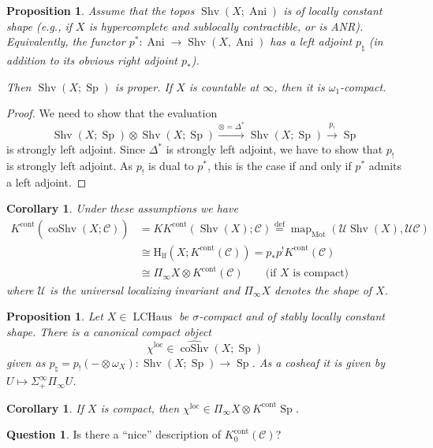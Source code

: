 \documentclass[draft]{amsart}
\renewcommand{\H}{\mathrm{H}}
\newcommand{\wh}[1]{\widehat{#1}}
\newcommand{\cat}[1]{\mathcal{#1}}
\newcommand{\blank}{-} %
\DeclareMathOperator{\Anima}{Ani}
\DeclareMathOperator{\LCHaus}{LCHaus}
\DeclareMathOperator{\coShv}{coShv}
\DeclareMathOperator{\Mot}{Mot}
\DeclareMathOperator{\map}{map}
\DeclareMathOperator{\Shv}{Shv}
\DeclareMathOperator{\Sp}{Sp}
\newtheorem{prop}[thm]{Proposition}
\newtheorem{cor}[thm]{Corollary}
\theoremstyle{definition}
\newtheorem{question}[thm]{Question}
\begin{document}
\begin{prop}
Assume that the topos $\Shv(X;\Anima)$ is of locally constant shape (e.g., if $X$ is hypercomplete and sublocally contractible, or is ANR). Equivalently, the functor $p^*\colon \Anima \to \Shv(X,\Anima)$ has a left adjoint $p_{\natural}$ (in addition to its obvious right adjoint $p_*$).

Then $\Shv(X; \Sp)$ is proper. If $X$ is countable at $\infty$, then it is $\omega_1$-compact.
\end{prop}
\begin{proof}
We need to show that the evaluation
\[
\Shv(X;\Sp) \otimes \Shv(X;\Sp) \xrightarrow{\otimes=\Delta^*} \Shv(X;\Sp) \xrightarrow{p_!} \Sp
\]
is strongly left adjoint. Since $\Delta^*$ is strongly left adjoint, we have to show that $p_!$ is strongly left adjoint. As $p_!$ is dual to $p^*$, this is the case if and only if $p^*$ admits a left adjoint.
\end{proof}

\begin{cor}
Under these assumptions we have
\begin{align*}
K^{\mathrm{cont}}(\wh{\coShv}(X;\cat C)) &= {KK}^{\mathrm{cont}}(\Shv(X); \cat C) \stackrel{\text{def}}{=} \map_{\Mot}(\cat U\Shv(X), \cat U\cat C) \\
&\cong \H_{\mathrm{lf}}(X;K^{\mathrm{cont}}(\cat C)) = p_*p^!K^{\mathrm{cont}}(\cat C) \\
&\cong \Pi_\infty X \otimes K^{\mathrm{cont}}(\cat C) \qquad\text{(if $X$ is compact)}
\end{align*}
where $\cat U$ is the universal localizing invariant and $\Pi_\infty X$ denotes the shape of $X$.
\end{cor}

\begin{prop}
Let $X\in \LCHaus$ be $\sigma$-compact and of stably locally constant shape.
There is a canonical compact object
\[
\chi^{\mathrm{loc}} \in \wh{\coShv}(X;\Sp)
\]
given as $p_\natural = p_!(\blank\otimes \omega_X) \colon \Shv(X;\Sp) \to \Sp$. As a cosheaf it is given by $U\mapsto \Sigma^\infty_+\Pi_\infty U$.
\end{prop}

\begin{cor}
If $X$ is compact, then $\chi^{\mathrm{loc}} \in \Pi_\infty X\otimes K^{\mathrm{cont}}\Sp$.
\end{cor}

\begin{question}
Is there a \enquote{nice} description of $K_0^{\mathrm{cont}}(\cat C)$?
\end{question}
\end{document}
